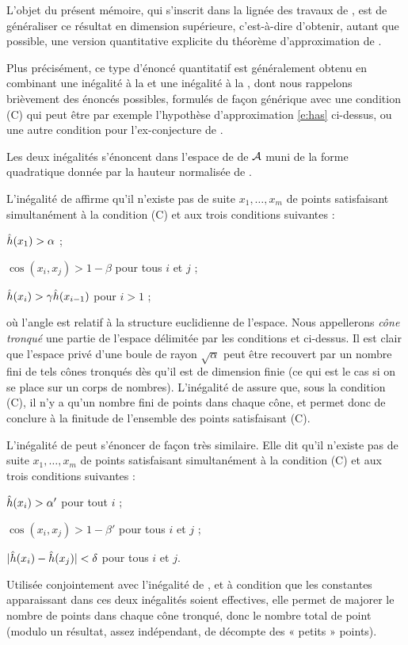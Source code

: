 L'objet du présent mémoire, qui s'inscrit dans la lignée des travaux de
, est de généraliser ce résultat en dimension supérieure,
c'est-à-dire d'obtenir, autant que possible, une version quantitative
explicite du théorème d'approximation de .

\medskip

Plus précisément, ce type d'énoncé quantitatif est généralement obtenu en
combinant une inégalité à la  et une inégalité à la ,
dont nous rappelons brièvement des énoncés possibles, formulés de façon
générique avec une condition (C) qui peut être par exemple l'hypothèse
d'approximation \eqref{e:has} ci-dessus, ou une autre condition pour
l'ex-conjecture de .

Les deux inégalités s'énoncent dans l'espace de  de \( \mathcal A \)
muni de la forme quadratique donnée par la hauteur normalisée de
.

L'inégalité de  affirme qu'il n'existe pas de suite \( x_1, \dots,
  x_m \) de points satisfaisant simultanément à la condition (C) et aux trois
conditions suivantes :
\begin{enumthm}
  \item \( \hat h (x_1) > \alpha \) ; \label{i:grand}
  \item \( \cos(x_i, x_j) > 1 - \beta \) pour tous \( i \) et \( j \) ;
    \label{i:proche}
  \item \( \hat h (x_i) > \gamma \hat h (x_{i-1}) \) pour \( i > 1 \) ;
\end{enumthm}
où l'angle est relatif à la structure euclidienne de l'espace. Nous
appellerons \emph{cône tronqué} une partie de l'espace délimitée par les
conditions  et  ci-dessus. Il est clair que
l'espace privé d'une boule de rayon \( \sqrt{\alpha} \) peut être recouvert
par un nombre fini de tels cônes tronqués dès qu'il est de dimension finie (ce
qui est le cas si on se place sur un corps de nombres). L'inégalité de
 assure que, sous la condition (C), il n'y a qu'un nombre fini de
points dans chaque cône, et permet donc de conclure à la finitude de
l'ensemble des points satisfaisant (C).

L'inégalité de  peut s'énoncer de façon très similaire. Elle dit
qu'il n'existe pas de suite \( x_1, \dots, x_m \) de points satisfaisant
simultanément à la condition (C) et aux trois conditions suivantes :
\begin{enumthm}
  \item \( \hat h (x_i) > \alpha' \) pour tout \( i \) ;
  \item \( \cos(x_i, x_j) > 1 - \beta' \) pour tous \( i \) et \( j \) ;
  \item \( \lvert \hat h (x_i) - \hat h (x_j) \rvert < \delta \) pour tous \( i \) et
    \( j \).
\end{enumthm}
Utilisée conjointement avec l'inégalité de , et à condition que les
constantes apparaissant dans ces deux inégalités soient effectives, elle
permet de majorer le nombre de points dans chaque cône tronqué, donc le nombre
total de point (modulo un résultat, assez indépendant, de décompte des «
petits » points).

